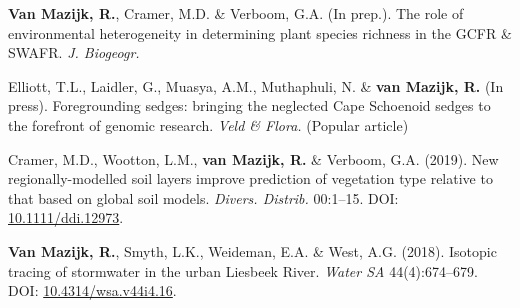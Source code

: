 \begin{hangparas}{2em}{1}


\textbf{Van Mazijk, R.}, Cramer, M.D. \& Verboom, G.A. (In prep.). The role of
environmental heterogeneity in determining plant species richness in the GCFR \&
SWAFR. \textit{J. Biogeogr.}

Elliott, T.L., Laidler, G., Muasya, A.M., Muthaphuli, N. \& \textbf{van Mazijk, 
R.} (In press). Foregrounding sedges: bringing the neglected Cape Schoenoid 
sedges to the forefront of genomic research. \textit{Veld \& Flora.} (Popular
article)

Cramer, M.D., Wootton, L.M., \textbf{van Mazijk, R.} \& Verboom, G.A. (2019).
New regionally-modelled soil layers improve prediction of vegetation type
relative to that based on global soil models. \textit{Divers. Distrib.}
00:1--15. DOI: \href{https://doi.org/10.1111/ddi.12973}{10.1111/ddi.12973}.

\textbf{Van Mazijk, R.}, Smyth, L.K., Weideman, E.A. \& West, A.G. (2018).
Isotopic tracing of stormwater in the urban Liesbeek River. \textit{Water SA}
44(4):674--679. DOI:
\href{https://doi.org/10.4314/wsa.v44i4.16}{10.4314/wsa.v44i4.16}.

\end{hangparas}
